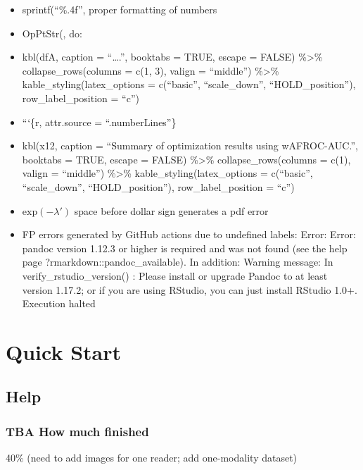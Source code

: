 \documentclass[
]{book}
\providecommand{\tightlist}{%
  \setlength{\itemsep}{0pt}\setlength{\parskip}{0pt}}
\begin{document}
\begin{itemize}
\tightlist
\item
  sprintf(``\%.4f'', proper formatting of numbers
\item
  OpPtStr(, do:
\item
  kbl(dfA, caption = ``\ldots.'', booktabs = TRUE, escape = FALSE) \%\textgreater\% collapse\_rows(columns = c(1, 3), valign = ``middle'') \%\textgreater\% kable\_styling(latex\_options = c(``basic'', ``scale\_down'', ``HOLD\_position''), row\_label\_position = ``c'')
\item
  ```\{r, attr.source = ``.numberLines''\}
\item
  kbl(x12, caption = ``Summary of optimization results using wAFROC-AUC.'', booktabs = TRUE, escape = FALSE) \%\textgreater\% collapse\_rows(columns = c(1), valign = ``middle'') \%\textgreater\% kable\_styling(latex\_options = c(``basic'', ``scale\_down'', ``HOLD\_position''), row\_label\_position = ``c'')
\item
  \(\text{exp} \left ( -\lambda' \right )\) space before dollar sign generates a pdf error
\item
  FP errors generated by GitHub actions due to undefined labels:
  Error: Error: pandoc version 1.12.3 or higher is required and was not found (see the help page ?rmarkdown::pandoc\_available).
  In addition: Warning message:
  In verify\_rstudio\_version() :
  Please install or upgrade Pandoc to at least version 1.17.2; or if you are using RStudio, you can just install RStudio 1.0+.
  Execution halted
\end{itemize}

\hypertarget{part-quick-start}{%
\part*{Quick Start}\label{part-quick-start}}

\hypertarget{quick-start-help}{%
\chapter{Help}\label{quick-start-help}}

\hypertarget{quick-start-help-how-much-finished}{%
\section{TBA How much finished}\label{quick-start-help-how-much-finished}}

40\% (need to add images for one reader; add one-modality dataset)
\end{document}
